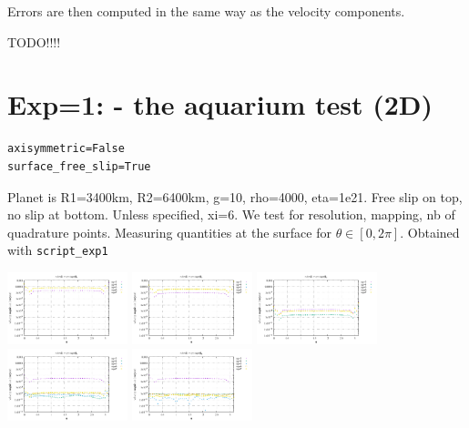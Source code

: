 Errors are then computed in the same way as the velocity components.


TODO!!!!







\newpage
\section*{Exp=1: - the aquarium test (2D)}

\begin{lstlisting}
axisymmetric=False
surface_free_slip=True
\end{lstlisting}

Planet is R1=3400km, R2=6400km, g=10, rho=4000, eta=1e21.
Free slip on top, no slip at bottom. Unless specified, xi=6.
We test for resolution, mapping, nb of quadrature points.
Measuring quantities at the surface for $\theta\in[0,2\pi]$.
Obtained with {\tt script\_exp1}


\noindent
\includegraphics[width=3.5cm]{python_codes/fieldstone_152/RESULTS/exp1_2D/vel_16_m2}
\includegraphics[width=3.5cm]{python_codes/fieldstone_152/RESULTS/exp1_2D/vel_16_m3}
\includegraphics[width=3.5cm]{python_codes/fieldstone_152/RESULTS/exp1_2D/vel_16_m4}
\includegraphics[width=3.5cm]{python_codes/fieldstone_152/RESULTS/exp1_2D/vel_16_m5}
\includegraphics[width=3.5cm]{python_codes/fieldstone_152/RESULTS/exp1_2D/vel_16_m6}

